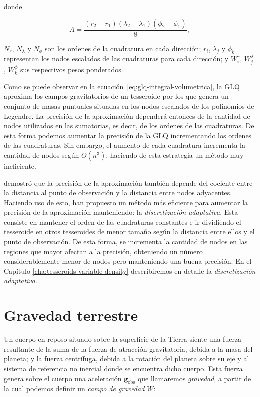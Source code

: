 \noindent donde

\begin{equation}
    A = \frac{
        (r_2 - r_1) (\lambda_2 - \lambda_1) (\phi_2 - \phi_1)
    }{8},
\end{equation}

\noindent $N_r$, $N_\lambda$ y $N_\phi$ son los ordenes de la cuadratura en
cada dirección; $r_i$, $\lambda_j$ y $\phi_k$ representan los nodos escalados
de las cuadraturas para cada dirección; y $W_i^r$, $W_j^\lambda$, $W_k^\phi$
sus respectivos pesos ponderados.

Como se puede observar en la ecuación~\ref{eq:glq-integral-volumetrica}, la
\ac{GLQ} aproxima los campos gravitatorios de un tesseroide por los que genera
un conjunto de masas puntuales situadas en los nodos escalados de los
polinomios de Legendre.
La precisión de la aproximación dependerá entonces de la cantidad de nodos
utilizados en las sumatorias, es decir, de los ordenes de las cuadraturas.
De esta forma podemos aumentar la precisión de la \ac{GLQ} incrementando los
ordenes de las cuadraturas.
Sin embargo, el aumento de cada cuadratura incrementa la cantidad de nodos
según $O(n^3)$, haciendo de esta estrategia un método muy ineficiente.

\citet{ku1977} demostró que la precisión de la aproximación también depende del
cociente entre la distancia al punto de observación y la distancia entre nodos
adyacentes.
Haciendo uso de esto, \citet{li2011} han propuesto un método más eficiente para
aumentar la precisión de la aproximación manteniendo: la \emph{discretización
adaptativa}.
Esta consiste en mantener el orden de las cuadraturas constantes e ir
dividiendo el tesseroide en otros tesseroides de menor tamaño según la
distancia entre ellos y el punto de observación.
De esta forma, se incrementa la cantidad de nodos en las regiones que mayor
afectan a la precisión, obteniendo un número considerablemente menor de nodos
pero manteniendo una buena precisión.
En el Capítulo \ref{cha:tesseroids-variable-density} describiremos en detalle
la \emph{discretización adaptativa}.



\section{Gravedad terrestre}

Un cuerpo en reposo situado sobre la superficie de la Tierra siente una fuerza
resultante de la suma de la fuerza de atracción gravitatoria, debida a la masa
del planeta; y la fuerza centrífuga, debida a la rotación del planeta sobre su
eje y al sistema de referencia no inercial donde se encuentra dicho
cuerpo.
Esta fuerza genera sobre el cuerpo una aceleración $\mathbf{g}_\text{obs}$ que
llamaremos \emph{gravedad}, a partir de la cual podemos definir un
\emph{campo de gravedad} $W$:

